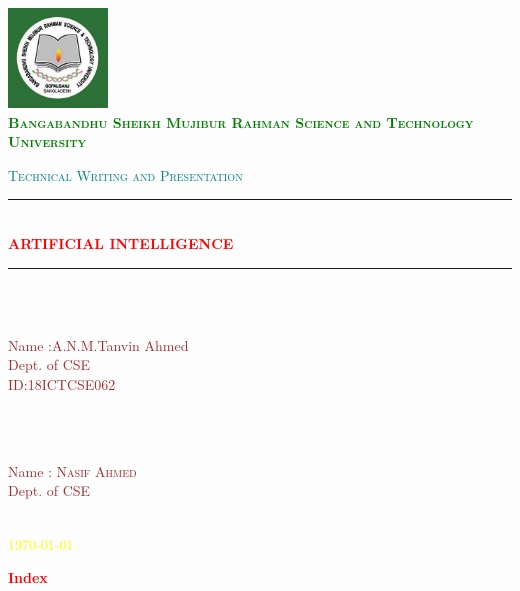 \documentclass[12pt]{article}
\begin{document}
\pagecolor{black!83}


\begin{titlepage}

\newcommand{\HRule}{\rule{\linewidth}{0.5mm}} 
\begin{center}
\includegraphics[width=100px, keepaspectratio]{10422078_1548897991993911_1856738101730602681_n}\\[1cm]
\textsc{\textbf{\textcolor{green}{\Large{Bangabandhu Sheikh Mujibur Rahman Science and Technology University}}}}\\[2cm]
\end{center}

\textsc{\Large \textcolor{teal}{Technical Writing and Presentation}}\\[0.5cm]
\HRule \\[0.4cm]
{ \huge \bfseries \textcolor{red}{ARTIFICIAL INTELLIGENCE}}\\[0.4cm] 
\HRule \\[1.5cm]
\begin{minipage}{0.4\textwidth}
\begin{flushleft} \large
\emph{\textcolor{white}{\Large Author:}}\\
\textcolor{brown}{Name :A.N.M.Tanvin Ahmed} \\\textcolor{brown}{Dept. of CSE} \\\textcolor{brown}{ID:18ICTCSE062} 
\end{flushleft}
\end{minipage}
~
\begin{minipage}{0.4\textwidth}
\begin{flushright} \large
\emph{\textcolor{white}{\Large Lecturer:}} \\
 \textcolor{brown}{Name : \textsc{Nasif Ahmed}\\\textcolor{brown}{Dept. of CSE}} \\
\end{flushright}
\end{minipage}\\[2cm]
{\large \textcolor{yellow}{ \today}}\\[.5cm] 
\end{titlepage}
\begin{center}
\begin{Huge}
\textbf{\textcolor{red}{Index}}\\
\end{Huge}
\end{center}
\end{document}
